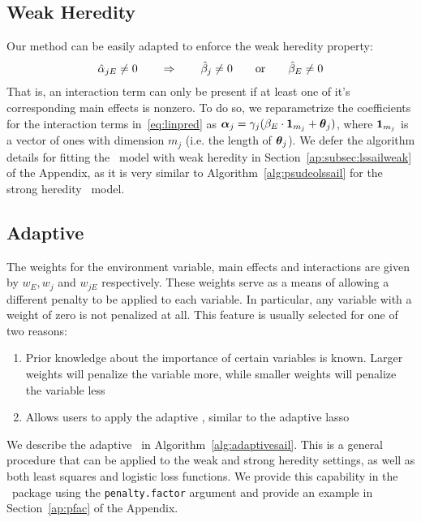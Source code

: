 \subsection{Weak Heredity}
Our method can be easily adapted to enforce the weak heredity property:
\begin{equation}
\hat{\alpha}_{jE} \neq 0 \qquad \Rightarrow \qquad \hat{\beta}_j \neq 0 \qquad \textrm{{or}} \qquad \hat{\beta}_E \neq 0   \label{eq:heredity2} \nonumber
\end{equation}
That is, an interaction term can only be present if at least one of it's corresponding main effects is nonzero. To do so, we reparametrize the coefficients for the interaction terms in~\eqref{eq:linpred} as $\boldsymbol{\alpha}_{j} = \gamma_{j}  (\beta_E \cdot \mathbf{1}_{m_j} + \boldsymbol{\theta}_j)$, where $\mathbf{1}_{m_j}$ is a vector of ones with dimension $m_j$ (i.e. the length of $\boldsymbol{\theta}_j$). We defer the algorithm details for fitting the \sail ~model with weak heredity in Section~\ref{ap:subsec:lssailweak} of the Appendix, as it is very similar to Algorithm~\ref{alg:psudeolssail} for the strong heredity \sail ~model. 


\subsection{Adaptive \sail}

The weights for the environment variable, main effects and interactions are given by $w_E, w_j$ and $w_{jE}$ respectively. These weights serve as a means of allowing a different penalty to be applied to each variable. In particular, any variable with a weight of zero is not penalized at all. This feature is usually selected for one of two reasons:  

\begin{enumerate}
	\item Prior knowledge about the importance of certain variables is known. Larger weights will penalize the variable more, while smaller weights will penalize the variable less  
	\item Allows users to apply the adaptive \sail, similar to the adaptive lasso~\citep{zou2006adaptive}
\end{enumerate}  

We describe the adaptive \sail ~in Algorithm~\ref{alg:adaptivesail}. This is a general procedure that can be applied to the weak and strong heredity settings, as well as both least squares and logistic loss functions. We provide this capability in the \sail ~package using the \texttt{penalty.factor} argument and provide an example in Section~\ref{ap:pfac} of the Appendix.

